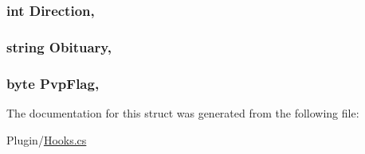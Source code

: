 \subsubsection[{Direction}]{\setlength{\rightskip}{0pt plus 5cm}int Direction\hspace{0.3cm}{\ttfamily [get]}, {\ttfamily [set]}}\label{structOTA_1_1Plugin_1_1HookArgs_1_1ObituaryReceived_a633488975bec9778113562927745d46c}
\hypertarget{structOTA_1_1Plugin_1_1HookArgs_1_1ObituaryReceived_a984f15b6811029d1850ee945c056d08f}{}
\subsubsection[{Obituary}]{\setlength{\rightskip}{0pt plus 5cm}string Obituary\hspace{0.3cm}{\ttfamily [get]}, {\ttfamily [set]}}\label{structOTA_1_1Plugin_1_1HookArgs_1_1ObituaryReceived_a984f15b6811029d1850ee945c056d08f}
\hypertarget{structOTA_1_1Plugin_1_1HookArgs_1_1ObituaryReceived_a7081c3650b34ffa2825d8584a0f6c9c8}{}
\subsubsection[{Pvp\+Flag}]{\setlength{\rightskip}{0pt plus 5cm}byte Pvp\+Flag\hspace{0.3cm}{\ttfamily [get]}, {\ttfamily [set]}}\label{structOTA_1_1Plugin_1_1HookArgs_1_1ObituaryReceived_a7081c3650b34ffa2825d8584a0f6c9c8}


The documentation for this struct was generated from the following file\+:\begin{DoxyCompactItemize}
\item 
Plugin/\hyperlink{Hooks_8cs}{Hooks.\+cs}\end{DoxyCompactItemize}
